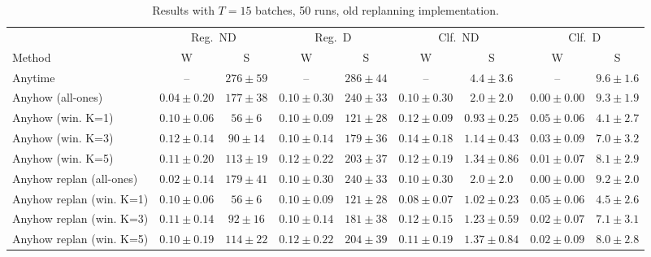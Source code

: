 \documentclass{uai2026} %
\newcommand{\1}{\mathbf{1}}
\begin{document}
\begin{table}[ht]
  \centering
  \caption{Results with $T = 15$ batches, 50 runs, old replanning implementation.}
  \label{tab:results-15-50-old}
  \small
  \begin{tabular}{@{}l|cc|cc|cc|cc@{}}
    \toprule
                             & \multicolumn{2}{c|}{Reg.\ ND}
                             & \multicolumn{2}{c|}{Reg.\ D}
                             & \multicolumn{2}{c|}{Clf.\ ND}
                             & \multicolumn{2}{c}{Clf.\ D}                                                                                                                         \\
    \cmidrule(lr){2-3}\cmidrule(lr){4-5}\cmidrule(lr){6-7}\cmidrule(lr){8-9}
    Method                   & W                             & S            & W               & S            & W               & S               & W               & S             \\
    \midrule
    Anytime                  & --                            & $276{\pm}59$ & --              & $286{\pm}44$ & --              & $4.4{\pm}3.6$   & --              & $9.6{\pm}1.6$ \\
    Anyhow (all-ones)        & $0.04{\pm}0.20$               & $177{\pm}38$ & $0.10{\pm}0.30$ & $240{\pm}33$ & $0.10{\pm}0.30$ & $2.0{\pm}2.0$   & $0.00{\pm}0.00$ & $9.3{\pm}1.9$ \\
    Anyhow (win. K=1)        & $0.10{\pm}0.06$               & $56{\pm}6$   & $0.10{\pm}0.09$ & $121{\pm}28$ & $0.12{\pm}0.09$ & $0.93{\pm}0.25$ & $0.05{\pm}0.06$ & $4.1{\pm}2.7$ \\
    Anyhow (win. K=3)        & $0.12{\pm}0.14$               & $90{\pm}14$  & $0.10{\pm}0.14$ & $179{\pm}36$ & $0.14{\pm}0.18$ & $1.14{\pm}0.43$ & $0.03{\pm}0.09$ & $7.0{\pm}3.2$ \\
    Anyhow (win. K=5)        & $0.11{\pm}0.20$               & $113{\pm}19$ & $0.12{\pm}0.22$ & $203{\pm}37$ & $0.12{\pm}0.19$ & $1.34{\pm}0.86$ & $0.01{\pm}0.07$ & $8.1{\pm}2.9$ \\
    Anyhow replan (all-ones) & $0.02{\pm}0.14$               & $179{\pm}41$ & $0.10{\pm}0.30$ & $240{\pm}33$ & $0.10{\pm}0.30$ & $2.0{\pm}2.0$   & $0.00{\pm}0.00$ & $9.2{\pm}2.0$ \\
    Anyhow replan (win. K=1) & $0.10{\pm}0.06$               & $56{\pm}6$   & $0.10{\pm}0.09$ & $121{\pm}28$ & $0.08{\pm}0.07$ & $1.02{\pm}0.23$ & $0.05{\pm}0.06$ & $4.5{\pm}2.6$ \\
    Anyhow replan (win. K=3) & $0.11{\pm}0.14$               & $92{\pm}16$  & $0.10{\pm}0.14$ & $181{\pm}38$ & $0.12{\pm}0.15$ & $1.23{\pm}0.59$ & $0.02{\pm}0.07$ & $7.1{\pm}3.1$ \\
    Anyhow replan (win. K=5) & $0.10{\pm}0.19$               & $114{\pm}22$ & $0.12{\pm}0.22$ & $204{\pm}39$ & $0.11{\pm}0.19$ & $1.37{\pm}0.84$ & $0.02{\pm}0.09$ & $8.0{\pm}2.8$ \\
    \bottomrule
  \end{tabular}
\end{table}
\end{document}
